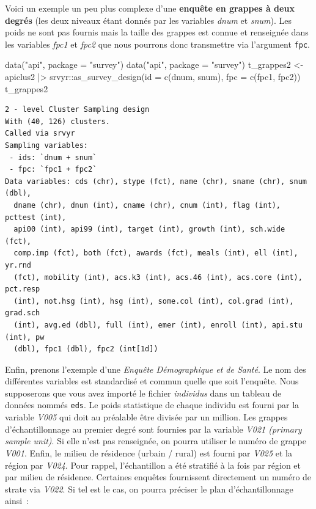 \documentclass[
  letterpaper,
  DIV=11,
  numbers=noendperiod,
  oneside]{scrreprt}
\newenvironment{Shaded}{\begin{snugshade}}{\end{snugshade}}
\newcommand{\AttributeTok}[1]{\textcolor[rgb]{0.40,0.45,0.13}{#1}}
\newcommand{\FunctionTok}[1]{\textcolor[rgb]{0.28,0.35,0.67}{#1}}
\newcommand{\NormalTok}[1]{\textcolor[rgb]{0.00,0.23,0.31}{#1}}
\newcommand{\OtherTok}[1]{\textcolor[rgb]{0.00,0.23,0.31}{#1}}
\newcommand{\SpecialCharTok}[1]{\textcolor[rgb]{0.37,0.37,0.37}{#1}}
\newcommand{\StringTok}[1]{\textcolor[rgb]{0.13,0.47,0.30}{#1}}
\begin{document}
Voici un exemple un peu plus complexe d'une \textbf{enquête en grappes à
deux degrés} (les deux niveaux étant donnés par les variables
\emph{dnum} et \emph{snum}). Les poids ne sont pas fournis mais la
taille des grappes est connue et renseignée dans les variables
\emph{fpc1} et \emph{fpc2} que nous pourrons donc transmettre via
l'argument \texttt{fpc}.

\begin{Shaded}
\begin{Highlighting}[]
\FunctionTok{data}\NormalTok{(}\StringTok{"api"}\NormalTok{, }\AttributeTok{package =} \StringTok{"survey"}\NormalTok{)}
\FunctionTok{data}\NormalTok{(}\StringTok{"api"}\NormalTok{, }\AttributeTok{package =} \StringTok{"survey"}\NormalTok{)}
\NormalTok{t\_grappes2 }\OtherTok{\textless{}{-}}\NormalTok{ apiclus2 }\SpecialCharTok{|\textgreater{}} 
\NormalTok{    srvyr}\SpecialCharTok{::}\FunctionTok{as\_survey\_design}\NormalTok{(}\AttributeTok{id =} \FunctionTok{c}\NormalTok{(dnum, snum), }\AttributeTok{fpc =} \FunctionTok{c}\NormalTok{(fpc1, fpc2))}
\NormalTok{t\_grappes2}
\end{Highlighting}
\end{Shaded}

\begin{verbatim}
2 - level Cluster Sampling design
With (40, 126) clusters.
Called via srvyr
Sampling variables:
 - ids: `dnum + snum`
 - fpc: `fpc1 + fpc2`
Data variables: cds (chr), stype (fct), name (chr), sname (chr), snum (dbl),
  dname (chr), dnum (int), cname (chr), cnum (int), flag (int), pcttest (int),
  api00 (int), api99 (int), target (int), growth (int), sch.wide (fct),
  comp.imp (fct), both (fct), awards (fct), meals (int), ell (int), yr.rnd
  (fct), mobility (int), acs.k3 (int), acs.46 (int), acs.core (int), pct.resp
  (int), not.hsg (int), hsg (int), some.col (int), col.grad (int), grad.sch
  (int), avg.ed (dbl), full (int), emer (int), enroll (int), api.stu (int), pw
  (dbl), fpc1 (dbl), fpc2 (int[1d])
\end{verbatim}

Enfin, prenons l'exemple d'une \emph{Enquête Démographique et de Santé}.
Le nom des différentes variables est standardisé et commun quelle que
soit l'enquête. Nous supposerons que vous avez importé le fichier
\emph{individus} dans un tableau de données nommés \texttt{eds}. Le
poids statistique de chaque individu est fourni par la variable
\emph{V005} qui doit au préalable être divisée par un million. Les
grappes d'échantillonnage au premier degré sont fournies par la variable
\emph{V021 (primary sample unit)}. Si elle n'est pas renseignée, on
pourra utiliser le numéro de grappe \emph{V001}. Enfin, le milieu de
résidence (urbain / rural) est fourni par \emph{V025} et la région par
\emph{V024}. Pour rappel, l'échantillon a été stratifié à la fois par
région et par milieu de résidence. Certaines enquêtes fournissent
directement un numéro de strate via \emph{V022}. Si tel est le cas, on
pourra préciser le plan d'échantillonnage ainsi~:
\end{document}
